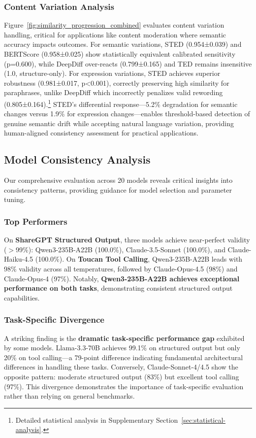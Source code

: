 \documentclass{article}
\begin{document}
\subsubsection{Content Variation Analysis}
Figure~\ref{fig:similarity_progression_combined} evaluates content variation handling, critical for applications like content moderation where semantic accuracy impacts outcomes. For semantic variations, STED (0.954±0.039) and BERTScore (0.958±0.025) show statistically equivalent calibrated sensitivity (p=0.600), while DeepDiff over-reacts (0.799±0.165) and TED remains insensitive (1.0, structure-only). For expression variations, STED achieves superior robustness (0.981±0.017, p<0.001), correctly preserving high similarity for paraphrases, unlike DeepDiff which incorrectly penalizes valid rewording (0.805±0.164).\footnote{Detailed statistical analysis in Supplementary Section~\ref{sec:statistical-analysis}.} STED's differential response—5.2\% degradation for semantic changes versus 1.9\% for expression changes—enables threshold-based detection of genuine semantic drift while accepting natural language variation, providing human-aligned consistency assessment for practical applications.

\vspace{-3mm}
\subsection{Model Consistency Analysis}
\vspace{-3mm}
Our comprehensive evaluation across 20 models reveals critical insights into consistency patterns, providing guidance for model selection and parameter tuning.

\subsubsection{Top Performers}
On \textbf{ShareGPT Structured Output}, three models achieve near-perfect validity ($>$99\%): Qwen3-235B-A22B (100.0\%), Claude-3.5-Sonnet (100.0\%), and Claude-Haiku-4.5 (100.0\%). On \textbf{Toucan Tool Calling}, Qwen3-235B-A22B leads with 98\% validity across all temperatures, followed by Claude-Opus-4.5 (98\%) and Claude-Opus-4 (97\%). Notably, \textbf{Qwen3-235B-A22B achieves exceptional performance on both tasks}, demonstrating consistent structured output capabilities.

\subsubsection{Task-Specific Divergence}
A striking finding is the \textbf{dramatic task-specific performance gap} exhibited by some models. Llama-3.3-70B achieves 99.1\% on structured output but only 20\% on tool calling---a 79-point difference indicating fundamental architectural differences in handling these tasks. Conversely, Claude-Sonnet-4/4.5 show the opposite pattern: moderate structured output (83\%) but excellent tool calling (97\%). This divergence demonstrates the importance of task-specific evaluation rather than relying on general benchmarks.
\end{document}
